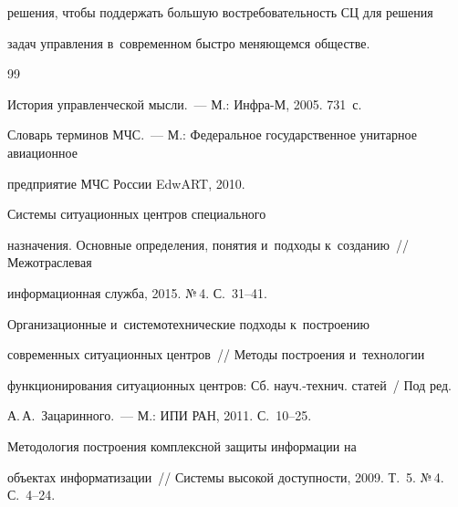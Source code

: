 решения, чтобы поддержать большую востребовательность СЦ для решения 

задач управления в~современном быстро меняющемся обществе.



    \vspace*{-4pt}

      

{\small\frenchspacing

{%


\begin{thebibliography}{99}



    \vspace*{-2pt}

    


 История управленческой мысли.~--- М.: Инфра-М, 2005. 731~с.


Словарь терминов МЧС.~--- М.: Федеральное государственное унитарное авиационное 

предприятие МЧС России EdwART, 2010. 


 Системы ситуационных центров специального 

назначения. Основные определения, понятия и~подходы к~созданию~/\!\!/ Меж\-отрас\-ле\-вая 

информационная служба, 2015. №\,4. С.~31--41.


 Организационные и~сис\-те\-мо\-тех\-ни\-че\-ские подходы к~построению 

современных ситуационных центров~/\!\!/ Методы построения и~технологии 

функционирования ситуационных центров: Сб. науч.-технич. статей~/ Под ред.  

А.\,А.~Зацаринного.~--- М.: ИПИ РАН, 2011. С.~10--25. 


 Методология построения комплексной защиты информации на 

объектах информатизации~/\!\!/ Системы высокой доступности, 2009. Т.~5. №\,4. С.~4--24.



\end{thebibliography}}}
